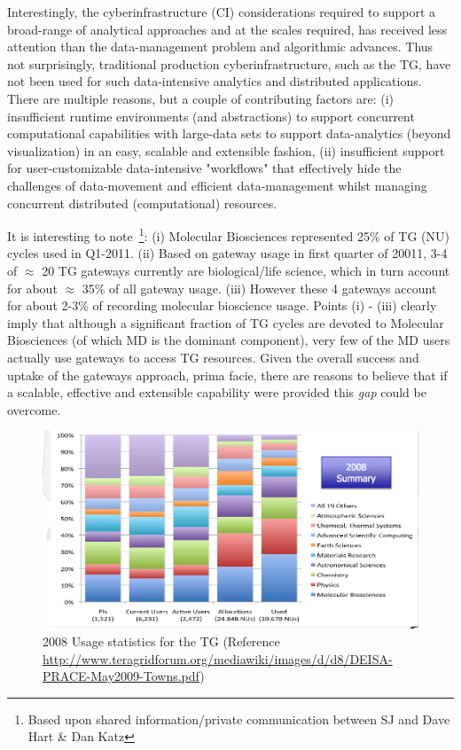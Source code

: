 \documentclass[]{article}
\begin{document}


Interestingly, the cyberinfrastructure (CI) considerations required to
support a broad-range of analytical approaches and at the scales
required, has received less attention than the data-management problem
and algorithmic advances.  Thus not surprisingly, traditional
production cyberinfrastructure, such as the TG, have not been used for
such data-intensive analytics and distributed applications. There are
multiple reasons, but a couple of contributing factors are: (i)
insufficient runtime environments (and abstractions) to support
concurrent computational capabilities with large-data sets to support
data-analytics (beyond visualization) in an easy, scalable and
extensible fashion, (ii) insufficient support for user-customizable
data-intensive "workflows" that effectively hide the challenges of
data-movement and efficient data-management whilst managing concurrent
distributed (computational) resources.

It is interesting to note~\footnote{Based upon shared
  information/private communication between SJ and Dave Hart \& Dan
  Katz}: (i) Molecular Biosciences represented 25\% of TG (NU) cycles
used in Q1-2011.  (ii) Based on gateway usage in first quarter of
20011, 3-4 of $\approx$ 20 TG gateways currently are biological/life
science, which in turn account for about $\approx$ 35\% of all gateway
usage. (iii) However these 4 gateways account for about 2-3\% of
recording molecular bioscience usage. Points (i) - (iii) clearly imply
that although a significant fraction of TG cycles are devoted to
Molecular Biosciences (of which MD is the dominant component), very
few of the MD users actually use gateways to access TG resources.
Given the overall success and uptake of the gateways approach, prima
facie, there are reasons to believe that if a scalable, effective and
extensible capability were provided this {\it gap} could be overcome.
 
\begin{figure}
 \centering
\includegraphics[scale=0.27]{figures/teragrid-discipline08}
\caption{\small 2008 Usage statistics for the TG (Reference
  \url{http://www.teragridforum.org/mediawiki/images/d/d8/DEISA-PRACE-May2009-Towns.pdf})}
  \label{tg2008}
\end{figure}
\end{document}
